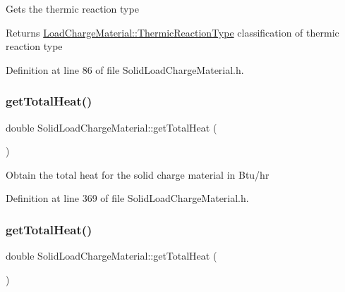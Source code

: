 Gets the thermic reaction type \begin{DoxyReturn}{Returns}
\hyperlink{namespace_load_charge_material_a51d4263e865a5d86236622dd3fe23fd1}{Load\+Charge\+Material\+::\+Thermic\+Reaction\+Type} classification of thermic reaction type 
\end{DoxyReturn}


Definition at line 86 of file Solid\+Load\+Charge\+Material.\+h.

\mbox{\label{class_solid_load_charge_material_af8593eb758c64236a8a026d6145584f4}} 
\subsubsection{\texorpdfstring{get\+Total\+Heat()}{getTotalHeat()}\hspace{0.1cm}{\footnotesize\ttfamily [1/3]}}
{\footnotesize\ttfamily double Solid\+Load\+Charge\+Material\+::get\+Total\+Heat (\begin{DoxyParamCaption}{ }\end{DoxyParamCaption})\hspace{0.3cm}{\ttfamily [inline]}}

Obtain the total heat for the solid charge material in Btu/hr 

Definition at line 369 of file Solid\+Load\+Charge\+Material.\+h.

\mbox{\label{class_solid_load_charge_material_af8593eb758c64236a8a026d6145584f4}} 
\subsubsection{\texorpdfstring{get\+Total\+Heat()}{getTotalHeat()}\hspace{0.1cm}{\footnotesize\ttfamily [2/3]}}
{\footnotesize\ttfamily double Solid\+Load\+Charge\+Material\+::get\+Total\+Heat (\begin{DoxyParamCaption}{ }\end{DoxyParamCaption})\hspace{0.3cm}{\ttfamily [inline]}}

